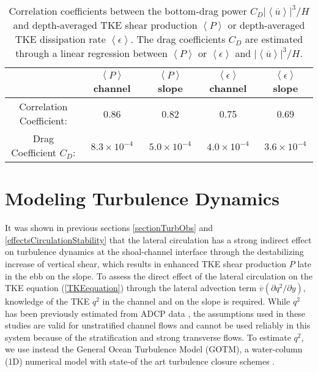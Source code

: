 \begin{table}[t]
\caption{Correlation coefficients between the bottom-drag power $C_D \left| \left\langle \overline{u} \right\rangle \right|^{3}/H$ and depth-averaged TKE shear production $\left\langle P \right\rangle$ or depth-averaged TKE dissipation rate $\left\langle \epsilon \right\rangle$. The drag coefficients $C_{D}$ are estimated through a linear regression between  $\left\langle P \right\rangle$ or $\left\langle \epsilon \right\rangle$ and $\left| \left\langle \overline{u} \right\rangle \right|^{3}/H$.}
\label{table1}
\begin{center}
\begin{tabular}{ccccc}
\hline\hline
 & $\left\langle P \right\rangle$ channel & $\left\langle P \right\rangle$ slope & $\left\langle \epsilon \right\rangle$ channel & $\left\langle \epsilon \right\rangle$ slope \\
\hline
 Correlation Coefficient: & 0.86 & 0.82 & 0.75 & 0.69 \\
 Drag Coefficient $C_{D}$: & $8.3 \times 10^{-4}$ & $5.0 \times 10^{-4}$ & $4.0 \times 10^{-4}$ & $ 3.6 \times 10^{-4}$ \\
\hline
\end{tabular}
\end{center}
\end{table}



\section{Modeling Turbulence Dynamics}
\label{modelingTurbulenceDynamics}

It was shown in previous sections \ref{sectionTurbObs} and \ref{effectsCirculationStability} that the lateral circulation has a strong indirect effect on turbulence dynamics at the shoal-channel interface through the destabilizing increase of vertical shear, which results in enhanced TKE shear production $P$ late in the ebb on the slope. To assess the direct effect of the lateral circulation on the TKE equation (\ref{TKEequation}) through the lateral advection term $\overline{v}\left(\partial q^2 / \partial y \right)$, knowledge of the TKE $q^2$ in the channel and on the slope is required. While $q^2$ has been previously estimated from ADCP data \parencite{Stacey:1999p886,Stacey:1999p2609}, the assumptions used in these studies are valid for unstratified channel flows and cannot be used reliably in this system because of the stratification and strong transverse flows. To estimate $q^2$, we use instead the General Ocean Turbulence Model (GOTM), a water-column (1D) numerical model with state-of the art turbulence closure schemes \parencite{Umlauf:2007p5322}. 


